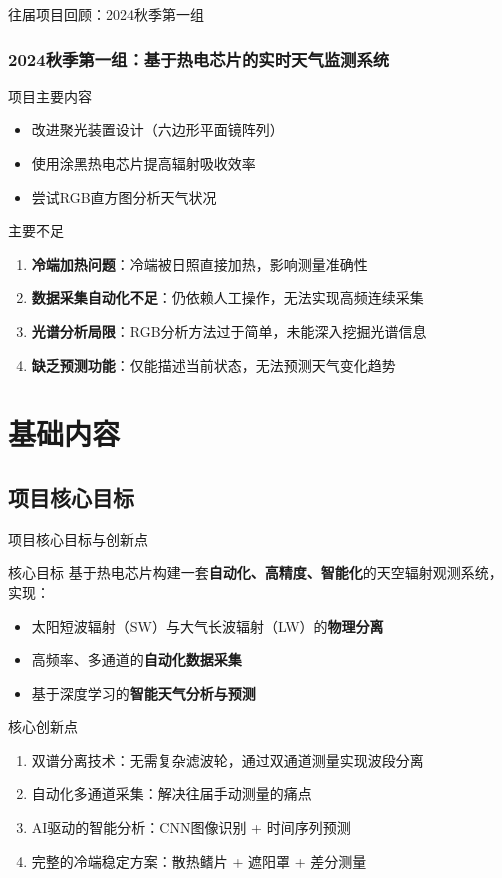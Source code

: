 \documentclass[aspectratio=169,11pt]{ctexbeamer}
\begin{document}
\begin{frame}{往届项目回顾：2024秋季第一组}
\frametitle{2024秋季第一组：基于热电芯片的实时天气监测系统}
\begin{block}{项目主要内容}
\begin{itemize}
    \item 改进聚光装置设计（六边形平面镜阵列）
    \item 使用涂黑热电芯片提高辐射吸收效率
    \item 尝试RGB直方图分析天气状况
\end{itemize}
\end{block}

\begin{alertblock}{主要不足}
\begin{enumerate}
    \item \textbf{冷端加热问题}：冷端被日照直接加热，影响测量准确性
    \item \textbf{数据采集自动化不足}：仍依赖人工操作，无法实现高频连续采集
    \item \textbf{光谱分析局限}：RGB分析方法过于简单，未能深入挖掘光谱信息
    \item \textbf{缺乏预测功能}：仅能描述当前状态，无法预测天气变化趋势
\end{enumerate}
\end{alertblock}
\end{frame}

\section{基础内容}

\subsection{项目核心目标}

\begin{frame}{项目核心目标与创新点}
\begin{block}{核心目标}
基于热电芯片构建一套\textbf{自动化、高精度、智能化}的天空辐射观测系统，实现：
\begin{itemize}
    \item 太阳短波辐射（SW）与大气长波辐射（LW）的\textbf{物理分离}
    \item 高频率、多通道的\textbf{自动化数据采集}
    \item 基于深度学习的\textbf{智能天气分析与预测}
\end{itemize}
\end{block}

\begin{block}{核心创新点}
\begin{enumerate}
    \item 双谱分离技术：无需复杂滤波轮，通过双通道测量实现波段分离
    \item 自动化多通道采集：解决往届手动测量的痛点
    \item AI驱动的智能分析：CNN图像识别 + 时间序列预测
    \item 完整的冷端稳定方案：散热鳍片 + 遮阳罩 + 差分测量
\end{enumerate}
\end{block}
\end{frame}
\end{document}
